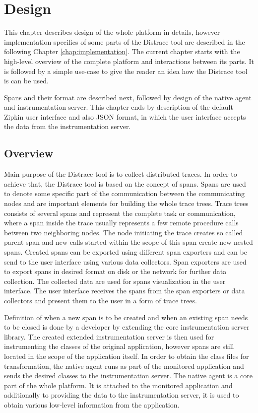 \chapter{Design}
\label{chap:design}
This chapter describes design of the whole platform in details, however implementation specifics of some parts of the Distrace tool are described in the following Chapter \ref{chap:implementation}. The current chapter starts with the high-level overview of the complete platform and interactions between its parts. It is followed by a simple use-case to give the reader an idea how the Distrace tool is can be used.

Spans and their format are described next, followed by design of the native agent and instrumentation server. This chapter ends by description of the default Zipkin user interface and also JSON format, in which the user interface accepts the data from the instrumentation server. 

\section{Overview}
\label{design:overview}
Main purpose of the Distrace tool is to collect distributed traces. In order to achieve that, the Distrace tool is based on the concept of spans. Spans are used to denote some specific part of the communication between the communicating nodes and are important elements for building the whole trace trees. Trace trees consists of several spans and represent the complete task or communication, where a span inside the trace usually represents a few remote procedure calls between two neighboring nodes. The node initiating the trace creates so called parent span and new calls started within the scope of this span create new nested spans. Created spans can be exported using different span exporters and can be send to the user interface using various data collectors. Span exporters are used to export spans in desired format on disk or the network for further data collection. The collected data are used for spans visualization in the user interface. The user interface receives the spans from the span exporters or data collectors and present them to the user in a form of trace trees.

Definition of when a new span is to be created and when an existing span needs to be closed is done by a developer by extending the core instrumentation server library. The created extended instrumentation server is then used for instrumenting the classes of the original application, however spans are still located in the scope of the application itself. In order to obtain the class files for transformation, the native agent runs as part of the monitored application and sends the desired classes to the instrumentation server. The native agent is a core part of the whole platform. It is attached to the monitored application and additionally to providing the data to the instrumentation server, it is used to obtain various low-level information from the application. 

